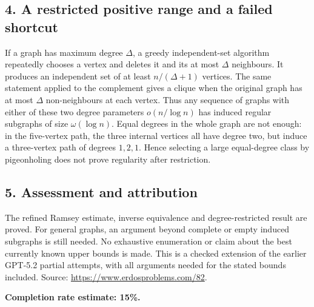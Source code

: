 \subsection*{4. A restricted positive range and a failed shortcut}
If a graph has maximum degree $\Delta$, a greedy independent-set algorithm repeatedly chooses a vertex and deletes it and its at most $\Delta$ neighbours. It produces an independent set of at least $n/(\Delta+1)$ vertices. The same statement applied to the complement gives a clique when the original graph has at most $\Delta$ non-neighbours at each vertex. Thus any sequence of graphs with either of these two degree parameters $o(n/\log n)$ has induced regular subgraphs of size $\omega(\log n)$.
Equal degrees in the whole graph are not enough: in the five-vertex path, the three internal vertices all have degree two, but induce a three-vertex path of degrees $1,2,1$. Hence selecting a large equal-degree class by pigeonholing does not prove regularity after restriction.

\subsection*{5. Assessment and attribution}
The refined Ramsey estimate, inverse equivalence and degree-restricted result are proved. For general graphs, an argument beyond complete or empty induced subgraphs is still needed. No exhaustive enumeration or claim about the best currently known upper bounds is made. This is a checked extension of the earlier GPT-5.2 partial attempts, with all arguments needed for the stated bounds included.
Source: \url{https://www.erdosproblems.com/82}.

\textbf{Completion rate estimate: 15\%.}
